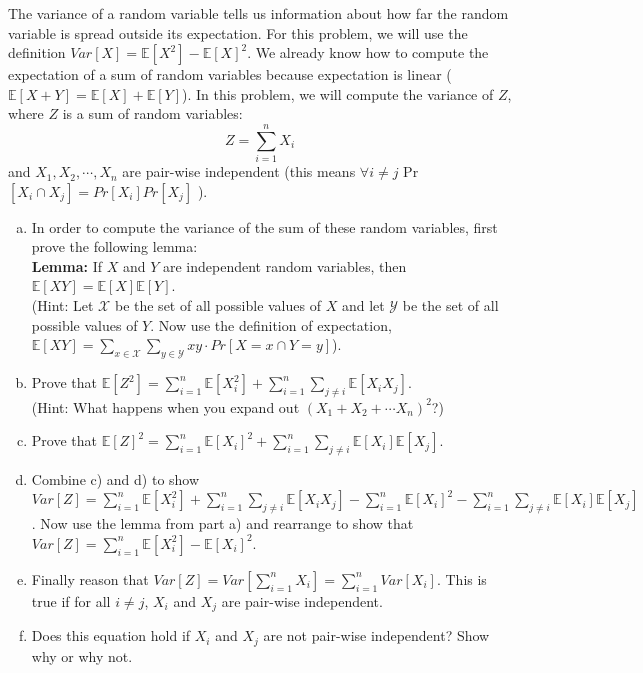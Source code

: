 \documentclass[]{article}
\def \exx {\mathbb{E}}
\begin{document}
\begin{qunlist}
\begin{enumerate}[a)]
\end{enumerate}


The variance of a random variable tells us information about how far the random variable is spread outside its expectation. For this problem, we will use the definition $Var[X] = \exx[X^2] - \exx[X]^2$.  We already know how to compute the expectation of a sum of random variables because expectation is linear ($\mathbb{E}[X+Y] = \mathbb{E}[X] + \mathbb{E}[Y]$). In this problem, we will compute the variance of $Z$, where $Z$ is a sum of random variables:
\[ Z = \sum_{i=1}^n X_i \]
and $X_1, X_2, \cdots, X_n$ are pair-wise independent (this means $\forall{i \neq} j $ Pr$[X_i \cap X_j] = Pr[X_i]Pr[X_j]$ ).
\begin{enumerate}[a)]
\qpart
\item In order to compute the variance of the sum of these random variables, first  prove the following lemma: \\ \textbf{Lemma:} If $X$ and $Y$ are independent random variables, then $\exx[XY] = \exx[X] \exx[Y]$. \\ 
(Hint: Let $\mathcal{X}$ be the set of all possible values of $X$ and let $\mathcal{Y}$ be the set of all possible values of $Y$. Now use the definition of expectation, $\exx[XY] = \sum\limits_{x \in \mathcal{X}} \sum\limits_{y \in \mathcal{Y}} xy \cdot Pr[X=x \cap Y = y]$).
\qpart
\item
Prove that $\exx[Z^2] = \sum\nolimits_{i=1}^n \exx[X_i^2] + \sum_{i=1}^n \sum_{j \neq i} \exx[X_iX_j]$. \\ 
(Hint: 
What happens when you expand out $(X_1 + X_2 + \cdots X_n)^2$?)
\qpart
\item Prove that $\exx[Z]^2 = \sum\nolimits_{i=1}^n \exx[X_i]^2 + \sum_{i=1}^n \sum\limits_{j \neq i} \exx[X_i] \exx[X_j]$.
\qpart
\item Combine c) and d) to show $Var[Z] = \sum\nolimits_{i=1}^n \exx[X_i^2] + \sum_{i=1}^n \sum\limits_{j \neq i} \exx[X_iX_j] -  \sum\nolimits_{i=1}^n \exx[X_i]^2 - \sum_{i=1}^n \sum\limits_{j \neq i} \exx[X_i] \exx[X_j]$. Now use the lemma from part a) and rearrange to show that $Var[Z] = \sum\nolimits_{i=1}^n \exx[X_i^2] - \exx[X_i]^2$.
\qpart
\item Finally reason that $Var[Z] = Var[\sum\nolimits_{i=1}^n X_i] =    \sum\nolimits_{i=1}^n Var[X_i]$. This is true if for all $i \neq j$, $X_i$ and $X_j$ are pair-wise independent.
\qpart
\item Does this equation hold if $X_i$ and $X_j$ are not pair-wise independent?  Show why or why not.


\end{enumerate}
\end{qunlist}
\end{document}
